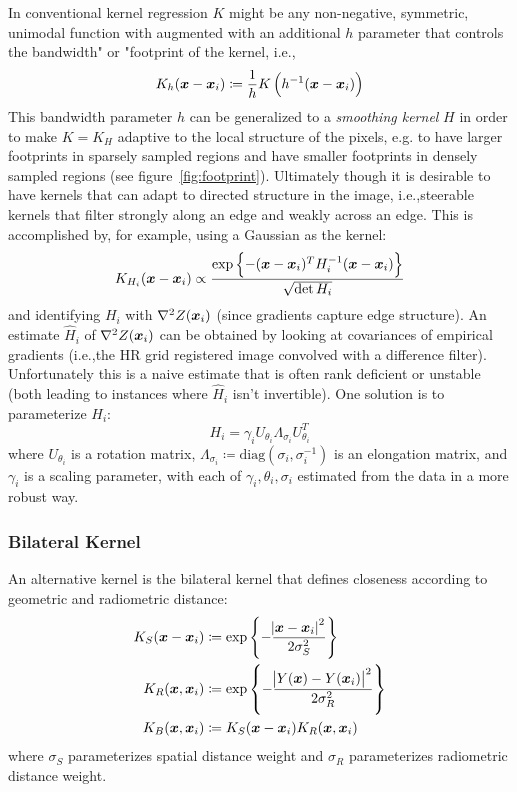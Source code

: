 In conventional kernel regression \(K\) might be any non-negative, symmetric, unimodal\cite{wand1994kernel} function with augmented with an additional \(h\) parameter that controls the bandwidth" or "footprint of the kernel, i.e.,\begin{equation}
	K_h(\bm{x} - \bm{x}_i) \coloneqq \frac{1}{h}K\left( h^{-1}(\bm{x} - \bm{x}_i) \right)
\end{equation}
This bandwidth parameter \(h\) can be generalized to a \textit{smoothing kernel} \(H\) in order to make \(K = K_H\) adaptive to the local structure of the pixels, e.g. to have larger footprints in sparsely sampled regions and have smaller footprints in densely sampled regions (see figure~\ref{fig:footprint}).
%
Ultimately though it is desirable to have kernels that can adapt to directed structure in the image, i.e.,steerable kernels that filter strongly along an edge and weakly across an edge.
%
This is accomplished by, for example, using a Gaussian as the kernel:
\begin{equation}
	K_{H_i}(\bm{x} - \bm{x}_i) \propto \frac{\exp\left\{ -(\bm{x} - \bm{x}_i)^T H^{-1}_i (\bm{x} - \bm{x}_i) \right\}}{\sqrt{\det{H_i}}}
\end{equation}
and identifying \(H_i\) with \(\nabla^2 Z(\bm{x}_i)\) (since gradients capture edge structure).
%
An estimate \(\hat{H}_i\) of \(\nabla^2 Z(\bm{x}_i)\) can be obtained by looking at covariances of empirical gradients (i.e.,the HR grid registered image convolved with a difference filter).
%
Unfortunately this is a naive estimate that is often rank deficient or unstable (both leading to instances where \(\hat{H}_i\) isn't invertible).
%
One solution is to parameterize \(H_i\):
\[
	H_i = \gamma_i U_{\theta_i} \Lambda_{\sigma_i} U_{\theta_i}^T
\]
where \(U_{\theta_i}\) is a rotation matrix, \(\Lambda_{\sigma_i} \coloneqq \text{diag}\left( \sigma_i, \sigma_i^{-1} \right)\) is an elongation matrix, and \(\gamma_i\) is a scaling parameter, with each of \(\gamma_i, \theta_i, \sigma_i\) estimated from the data in a more robust way.
%
\subsubsection{Bilateral Kernel}
An alternative kernel is the bilateral kernel\cite{Tomasi:1998:BFG:938978.939190} that defines closeness according to geometric and radiometric distance:
\begin{equation}
	\begin{split}
		K_S(\delx) &\coloneqq \exp \left\{ -\frac{\abs{ \delx }^2}{2 \sigma_S^2}  \right\} \\
		K_R(\bx, \bxi) &\coloneqq \exp \left\{ -  \frac{\abs{ Y(\bx) - Y(\bxi) }^2}{2 \sigma_R^2} \right\} \\
		K_B(\bx, \bxi) &\coloneqq K_S(\delx)K_R(\bx, \bxi)
	\end{split}
	\label{eqn:bilateralkernel}
\end{equation}
where \(\sigma_S\) parameterizes spatial distance weight and \(\sigma_R\) parameterizes radiometric distance weight.

